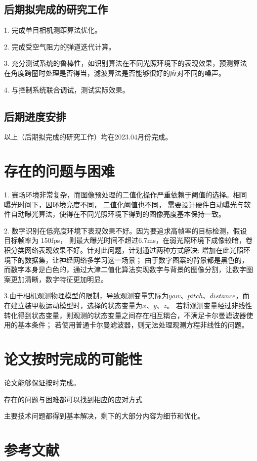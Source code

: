 \subsection{后期拟完成的研究工作}
1. 完成单目相机测距算法优化。\par
2. 完成受空气阻力的弹道迭代计算。\par
3. 充分测试系统的鲁棒性，如识别算法在不同光照环境下的表现效果，预测算法在角度跨圈时处理是否得当，滤波算法是否能够很好的应对不同的噪声。\par
4. 与控制系统联合调试，测试实际效果。\par
\subsection{后期进度安排}
以上（后期拟完成的研究工作）均在2023.04月份完成。
\section{存在的问题与困难}
1. 赛场环境非常复杂，而图像预处理的二值化操作严重依赖于阈值的选择。相同曝光时间下，因环境亮度不同， 二值化阈值也不同，
需要设计硬件自动曝光与软件自动曝光算法，使得在不同光照环境下得到的图像亮度基本保持一致。\par
2. 数字识别在低亮度环境下表现效果不好。因为要追求高帧率的目标检测，假设目标帧率为 150fps，
则最大曝光时间不超过6.7ms，在弱光照环境下成像较暗，卷积分类网络表现效果不好。针对此问题，计划通过两种方式解决:
增加在此光照环境下的数据集，让神经网络多学习这一场景；
由于数字图案的背景都是黑色的，而数字本身是白色的，通过大津二值化\cite{otsu1979threshold}算法实现数字与背景的图像分割，让数字图案更加清晰，数字特征更加明显。\par
3.由于相机观测物理模型的限制，导致观测变量实际为$yaw$、$pitch$、$distance$，而在建立装甲板运动模型时，选择的状态变量为$x$、$y$、$z$。
若将观测变量经过非线性转化得到状态变量，则观测的状态变量之间存在相互耦合，不满足卡尔曼滤波器使用的基本条件；
若使用普通卡尔曼滤波器，则无法处理观测方程非线性的问题。\par
\section{论文按时完成的可能性}
论文能够保证按时完成。\par
存在的问题与困难都可以找到相应的应对方式\par
主要技术问题都得到基本解决，剩下的大部分内容为细节和优化。\par

\section{参考文献}



